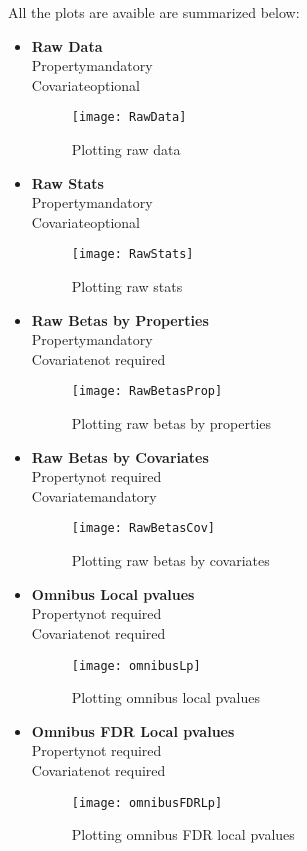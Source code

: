 \documentclass[fadttsterUserGuide_use]{subfiles}
\begin{document}
	All the plots are avaible are summarized below:
	\begin{itemize}
		\item \textbf{Raw Data}\\
		Property\textrightarrow mandatory\\
		Covariate\textrightarrow optional
		\begin{figure}[H]
  			\texttt{[image: RawData]}
  			\caption{Plotting raw data}
    		\label{fig:RawData}
		\end{figure}
		\item \textbf{Raw Stats}\\
		Property\textrightarrow mandatory\\
		Covariate\textrightarrow optional
		\begin{figure}[H]
  			\texttt{[image: RawStats]}
  			\caption{Plotting raw stats}
    		\label{fig:RawStats}
		\end{figure}
		\vfill
		\newpage
		
		\item \textbf{Raw Betas by Properties}\\
		Property\textrightarrow mandatory\\
		Covariate\textrightarrow not required
		\begin{figure}[H]
  			\texttt{[image: RawBetasProp]}
  			\caption{Plotting raw betas by properties}
    		\label{fig:RawBetasProp}
		\end{figure}		
		\item \textbf{Raw Betas by Covariates}\\
		Property\textrightarrow not required\\
		Covariate\textrightarrow mandatory
		\begin{figure}[H]
  			\texttt{[image: RawBetasCov]}
  			\caption{Plotting raw betas by covariates}
    		\label{fig:RawBetasCov}
		\end{figure}
		\vfill
		\newpage
		
		\item \textbf{Omnibus Local pvalues}\\
		Property\textrightarrow not required\\
		Covariate\textrightarrow not required
		\begin{figure}[H]
  			\texttt{[image: omnibusLp]}
  			\caption{Plotting omnibus local pvalues}
    		\label{fig:omnibusLp}
		\end{figure}
		\item \textbf{Omnibus FDR Local pvalues}\\
		Property\textrightarrow not required\\
		Covariate\textrightarrow not required
		\begin{figure}[H]
  			\texttt{[image: omnibusFDRLp]}
  			\caption{Plotting omnibus FDR local pvalues}
    		\label{fig:omnibusFDRLp}
		\end{figure}
		\vfill
		\newpage
		

\end{itemize}
\end{document}
